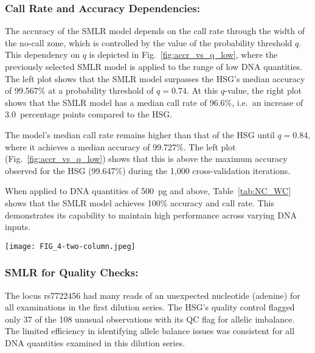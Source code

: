\documentclass[preprint,5p,times,11pt]{elsarticle}
\begin{document}
\subsubsection*{Call Rate and Accuracy Dependencies:}
The accuracy of the SMLR model depends on the call rate through the width of the no-call zone, which is controlled by the value of the probability threshold $q$.
This dependency on $q$ is depicted in Fig.~\ref{fig:accr_vs_q_low}, where the previously selected SMLR model is applied to the range of low DNA quantities.
The left plot shows that the SMLR model surpasses the HSG's median accuracy of 99.567\% at a probability threshold of $q=0.74$.
At this $q$-value, the right plot shows that the SMLR model has a median call rate of 96.6\%, i.e.~an increase of 3.0~percentage points compared to the HSG.

The model's median call rate remains higher than that of the HSG until $q=0.84$, where it achieves a median accuracy of 99.727\%.
The left plot (Fig.~\ref{fig:accr_vs_q_low}) shows that this is above the maximum accuracy observed for the HSG (99.647\%) during the 1,000 cross-validation iterations.

When applied to DNA quantities of \SI{500}{\pg} and above, Table~\ref{tab:NC_WC} shows that the SMLR model achieves 100\% accuracy and call rate.
This demonstrates its capability to maintain high performance across varying DNA inputs.
\begin{figure*}
\centering
\texttt{[image: FIG\_4-two-column.jpeg]}
\caption{
Performance of the SMLR model across probability thresholds, $q$ (legend applies to both plots).\\
The grey lines depict the model's performance in each of 1,000 cross-validation iterations.
The model was fitted with an intercept to square-root transformed allele signals and tested on data from the examinations of the DNA quantities indicated above the left plot.
The shaded horizontal bars represent the accuracy~(left) and call rate~(right) ranges for the HID SNP Genotyper Plugin.
Dotted lines mark the 25th and 75th percentiles among the 1,000 cross-validations, while dashed lines indicate medians.
}
\label{fig:accr_vs_q_low}
\end{figure*}


\subsubsection*{SMLR for Quality Checks:}
The locus rs7722456 had many reads of an unexpected nucleotide (adenine) for all examinations in the first dilution series.
The HSG's quality control flagged only 37 of the 108 unusual observations with its QC flag for allelic imbalance.
The limited efficiency in identifying allele balance issues was consistent for all DNA quantities examined in this dilution series.
\end{document}
